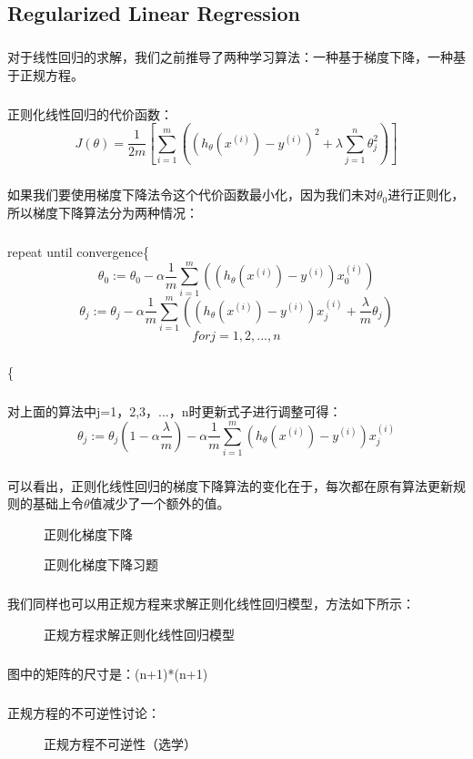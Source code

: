\documentclass{article}
\begin{document}
\begin{CJK}{UTF8}{gbsn}
\subsection{Regularized Linear Regression}
\subparagraph{}
对于线性回归的求解，我们之前推导了两种学习算法：一种基于梯度下降，一种基于正规方程。
\subparagraph{}
正则化线性回归的代价函数：
\begin{equation}
J(\theta)=\frac{1}{2m}[\sum_{i=1}^m((h_\theta(x^{(i)})-y^{(i)})^2+\lambda\sum_{j=1}^n\theta_j^2)]
\end{equation}
\subparagraph{}
如果我们要使用梯度下降法令这个代价函数最小化，因为我们未对$\theta_0$进行正则化，所以梯度下降算法分为两种情况：
\subparagraph{}
repeat until convergence\{{}
\begin{equation}
\theta_0:=\theta_0-\alpha\frac{1}{m}\sum_{i=1}^m((h_\theta(x^{(i)})-y^{(i)})x_0^{(i)})
\end{equation}
\begin{equation}
\theta_j:=\theta_j-\alpha\frac{1}{m}\sum_{i=1}^m((h_\theta(x^{(i)})-y^{(i)})x_j^{(i)}+\frac{\lambda}{m}\theta_j)
\end{equation}
\begin{equation}
for j=1,2,...,n
\end{equation}
\subparagraph{}
\{{}
\subparagraph{}
对上面的算法中j=1，2,3，...，n时更新式子进行调整可得：
\begin{equation}
\theta_j:=\theta_j(1-\alpha\frac{\lambda}{m})-\alpha\frac{1}{m}\sum_{i=1}^m(h_\theta(x^{(i)})-y^{(i)})x_j^{(i)}
\end{equation}
\subparagraph{}
可以看出，正则化线性回归的梯度下降算法的变化在于，每次都在原有算法更新规则的基础上令$\theta$值减少了一个额外的值。
\begin{figure}[H]
\caption{正则化梯度下降}
\label{fig:366}
\end{figure}
\begin{figure}[H]
\caption{正则化梯度下降习题}
\label{fig:365}
\end{figure}
\subparagraph{}
我们同样也可以用正规方程来求解正则化线性回归模型，方法如下所示：
\begin{figure}[H]
\label{fig:350}
\end{figure}
\begin{figure}[H]
\caption{正规方程求解正则化线性回归模型}
\label{fig:367}
\end{figure}
\subparagraph{}
图中的矩阵的尺寸是：(n+1)*(n+1)
\subparagraph{}
正规方程的不可逆性讨论：
\begin{figure}[H]
\caption{正规方程不可逆性（选学）}
\label{fig:368}
\end{figure}

\end{CJK}
\end{document}
